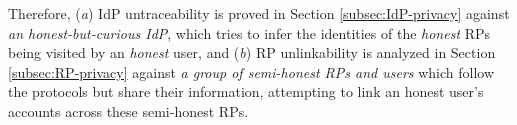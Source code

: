 Therefore, (\emph{a}) IdP untraceability is proved in Section \ref{subsec:IdP-privacy} against \emph{an honest-but-curious IdP}, which tries to infer the identities of the \emph{honest} RPs being visited by an \emph{honest} user,
and (\emph{b}) RP unlinkability is analyzed in Section \ref{subsec:RP-privacy} against \emph{a group of semi-honest RPs and users} which follow the protocols but share their information,
    attempting to link an honest user's accounts across these semi-honest RPs.

%





